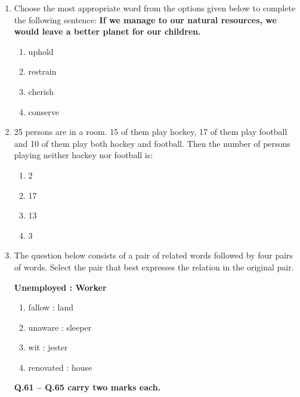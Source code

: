 \documentclass[journal]{IEEEtran}
\numberwithin{equation}{enumi}
\numberwithin{figure}{enumi}
\begin{document}
\begin{enumerate}
\item Choose the most appropriate word from the options given below to complete the following sentence:
\textbf{If we manage to \underline{\hspace{2cm}} our natural resources, we would leave a better planet for our children.}

\begin{enumerate}
    \item uphold
    \item restrain
    \item cherish
    \item conserve
\end{enumerate}



\item 25 persons are in a room. 15 of them play hockey, 17 of them play football and 10 of them play both hockey and football. Then the number of persons playing neither hockey nor football is:
 \hfill{}
\begin{multicols}{4}
    \begin{enumerate}
    \item 2
    \item 17
    \item 13
    \item 3
    \end{enumerate}
    \end{multicols}    






\item The question below consists of a pair of related words followed by four pairs of words. Select the pair that best expresses the relation in the original pair.

\textbf{Unemployed : Worker}

\begin{enumerate}
    \item fallow : land
    \item unaware : sleeper
    \item wit : jester
    \item renovated : house
\end{enumerate}



\vspace{0.5cm}

\textbf{Q.61 -- Q.65 carry two marks each.}
\vspace{0.5cm}


\end{enumerate}
\end{document}
